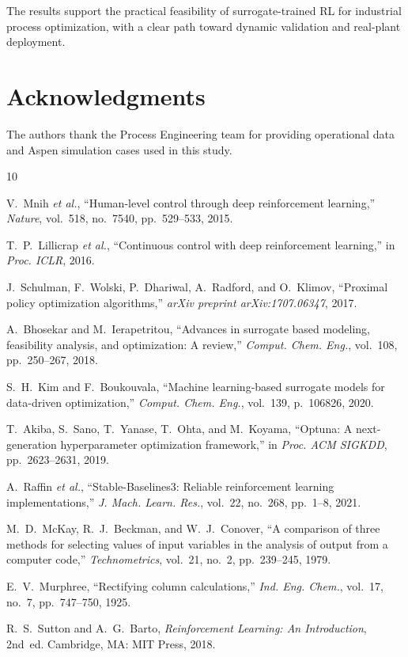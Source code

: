 \documentclass[journal,10pt,twocolumn]{IEEEtran}
\begin{document}
The results support the practical feasibility of surrogate-trained RL for industrial process optimization, with a clear path toward dynamic validation and real-plant deployment.

\section*{Acknowledgments}
The authors thank the Process Engineering team for providing operational data and Aspen simulation cases used in this study.

\begin{thebibliography}{10}

V.~Mnih \textit{et al.},
``Human-level control through deep reinforcement learning,''
\textit{Nature}, vol.~518, no.~7540, pp.~529--533, 2015.

T.~P.~Lillicrap \textit{et al.},
``Continuous control with deep reinforcement learning,''
in \textit{Proc. ICLR}, 2016.

J.~Schulman, F.~Wolski, P.~Dhariwal, A.~Radford, and O.~Klimov,
``Proximal policy optimization algorithms,''
\textit{arXiv preprint arXiv:1707.06347}, 2017.

A.~Bhosekar and M.~Ierapetritou,
``Advances in surrogate based modeling, feasibility analysis, and optimization: A review,''
\textit{Comput. Chem. Eng.}, vol.~108, pp.~250--267, 2018.

S.~H.~Kim and F.~Boukouvala,
``Machine learning-based surrogate models for data-driven optimization,''
\textit{Comput. Chem. Eng.}, vol.~139, p.~106826, 2020.

T.~Akiba, S.~Sano, T.~Yanase, T.~Ohta, and M.~Koyama,
``Optuna: A next-generation hyperparameter optimization framework,''
in \textit{Proc. ACM SIGKDD}, pp.~2623--2631, 2019.

A.~Raffin \textit{et al.},
``Stable-Baselines3: Reliable reinforcement learning implementations,''
\textit{J. Mach. Learn. Res.}, vol.~22, no.~268, pp.~1--8, 2021.

M.~D.~McKay, R.~J.~Beckman, and W.~J.~Conover,
``A comparison of three methods for selecting values of input variables in the analysis of output from a computer code,''
\textit{Technometrics}, vol.~21, no.~2, pp.~239--245, 1979.

E.~V.~Murphree,
``Rectifying column calculations,''
\textit{Ind. Eng. Chem.}, vol.~17, no.~7, pp.~747--750, 1925.

R.~S.~Sutton and A.~G.~Barto,
\textit{Reinforcement Learning: An Introduction}, 2nd~ed.
Cambridge, MA: MIT Press, 2018.

\end{thebibliography}
\end{document}

